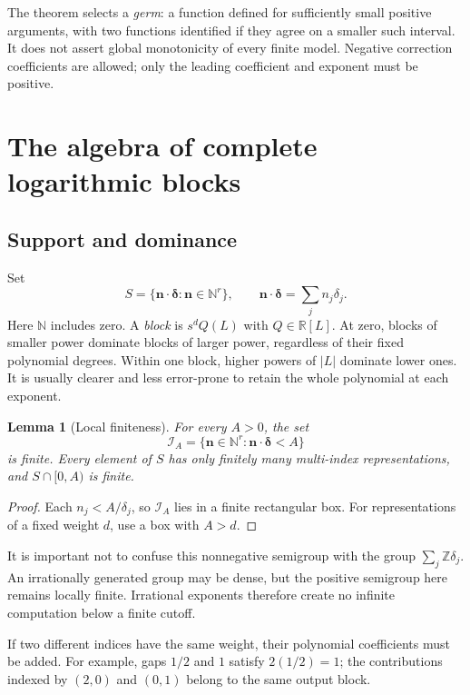 \documentclass[11pt,a4paper]{article}
\numberwithin{equation}{section}
\newtheorem{lemma}[theorem]{Lemma}
\theoremstyle{definition}
\newcommand{\R}{\mathbb R}
\newcommand{\N}{\mathbb N}
\newcommand{\nn}{\boldsymbol n}
\newcommand{\del}{\boldsymbol\delta}
\newcommand{\IA}{\mathcal I_A}
\begin{document}
The theorem selects a \emph{germ}: a function defined for sufficiently small
positive arguments, with two functions identified if they agree on a
smaller such interval. It does not assert global monotonicity of every
finite model. Negative correction coefficients are allowed; only the
leading coefficient and exponent must be positive.

\section{The algebra of complete logarithmic blocks}
\label{sec:algebra}

\subsection{Support and dominance}
Set
\begin{equation}\label{eq:semigroup}
 S=\{\nn\cdot\del:\nn\in\N^r\},\qquad
 \nn\cdot\del=\sum_j n_j\delta_j.
\end{equation}
Here $\N$ includes zero. A \emph{block} is $s^d Q(L)$ with
$Q\in\R[L]$. At zero, blocks of smaller power dominate blocks of larger
power, regardless of their fixed polynomial degrees. Within one block,
higher powers of $|L|$ dominate lower ones. It is usually clearer and less
error-prone to retain the whole polynomial at each exponent.

\begin{lemma}[Local finiteness]\label{lem:finite}
For every $A>0$, the set
\begin{equation}\label{eq:ideal}
 \IA=\{\nn\in\N^r:\nn\cdot\del<A\}
\end{equation}
is finite. Every element of $S$ has only finitely many multi-index
representations, and $S\cap[0,A)$ is finite.
\end{lemma}
\begin{proof}
Each $n_j<A/\delta_j$, so $\IA$ lies in a finite rectangular box.
For representations of a fixed weight $d$, use a box with $A>d$.
\end{proof}

It is important not to confuse this nonnegative semigroup with the group
$\sum_j\mathbb Z\delta_j$. An irrationally generated group may be dense,
but the positive semigroup here remains locally finite. Irrational
exponents therefore create no infinite computation below a finite cutoff.

If two different indices have the same weight, their polynomial
coefficients must be added. For example, gaps $1/2$ and $1$ satisfy
$2(1/2)=1$; the contributions indexed by $(2,0)$ and $(0,1)$ belong to the
same output block.
\end{document}
